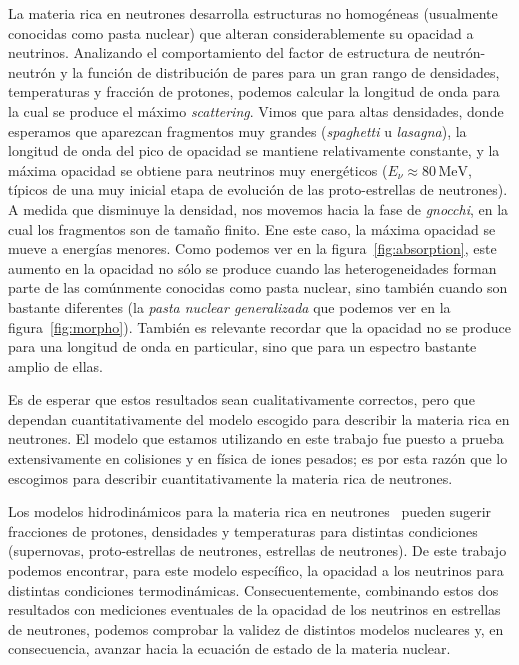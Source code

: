 La materia rica en neutrones desarrolla estructuras no homogéneas (usualmente conocidas como pasta nuclear) que alteran considerablemente su opacidad a neutrinos.
Analizando el comportamiento del factor de estructura de neutrón-neutrón y la función de distribución de pares para un gran rango de densidades, temperaturas y fracción de protones, podemos calcular la longitud de onda para la cual se produce el máximo \emph{scattering}.
Vimos que para altas densidades, donde esperamos que aparezcan fragmentos muy grandes (\emph{spaghetti} u \emph{lasagna}), la longitud de onda del pico de opacidad se mantiene relativamente constante, y la máxima opacidad se obtiene para neutrinos muy energéticos ($E_\nu \approx 80\,\text{MeV}$, típicos de una muy inicial etapa de evolución de las proto-estrellas de neutrones).
A medida que disminuye la densidad, nos movemos hacia la fase de \emph{gnocchi}, en la cual los fragmentos son de tamaño finito.
Ene este caso, la máxima opacidad se mueve a energías menores.
Como podemos ver en la figura~\ref{fig:absorption}, este aumento en la opacidad no sólo se produce cuando las heterogeneidades forman parte de las comúnmente conocidas como pasta nuclear, sino también cuando son bastante diferentes (la \emph{pasta nuclear generalizada} que podemos ver en la figura~\ref{fig:morpho}).
También es relevante recordar que la opacidad no se produce para una longitud de onda en particular, sino que para un espectro bastante amplio de ellas.

Es de esperar que estos resultados sean cualitativamente correctos, pero que dependan cuantitativamente del modelo escogido para describir la materia rica en neutrones.
El modelo que estamos utilizando en este trabajo fue puesto a prueba extensivamente en colisiones y en física de iones pesados; es por esta razón que lo escogimos para describir cuantitativamente la materia rica de neutrones.

Los modelos hidrodinámicos para la materia rica en neutrones~\cite{ruffert_coalescing_1995, mezzacappa_investigation_1998, geppert_temperature_2004, woosley_physics_2005, liebendorfer_supernova_2005} pueden sugerir fracciones de protones, densidades y temperaturas para distintas condiciones (supernovas, proto-estrellas de neutrones, estrellas de neutrones).
De este trabajo podemos encontrar, para este modelo específico, la opacidad a los neutrinos para distintas condiciones termodinámicas.
Consecuentemente, combinando estos dos resultados con mediciones eventuales de la opacidad de los neutrinos en estrellas de neutrones, podemos comprobar la validez de distintos modelos nucleares y, en consecuencia, avanzar hacia la ecuación de estado de la materia nuclear.


